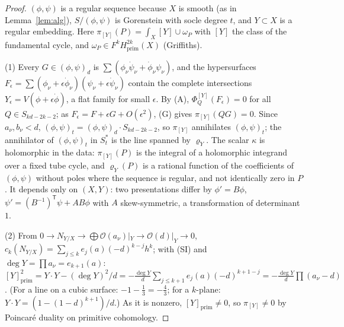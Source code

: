 \documentclass[11pt]{article}
\numberwithin{equation}{section}
\theoremstyle{remark}
\newcommand{\T}{\mathsf{T}}
\begin{document}
\begin{proof}
$(\phi,\psi)$ is a regular sequence because $X$ is smooth (as in Lemma~\ref{lem:alg}), $S/(\phi,\psi)$ is Gorenstein
with socle degree $t$, and $Y\subset X$ is a regular embedding. Here $\pi_{[Y]}(P)=\int_X[Y]\cup\omega_P$ with $[Y]$
the class of the fundamental cycle, and $\omega_P\in F^kH^{2k}_{\mathrm{prim}}(X)$ (Griffiths).

(1) Every $G\in(\phi,\psi)_d$ is $\sum(\phi_\nu\dot\psi_\nu+\dot\phi_\nu\psi_\nu)$, and the hypersurfaces
$F_\epsilon=\sum(\phi_\nu+\epsilon\dot\phi_\nu)(\psi_\nu+\epsilon\dot\psi_\nu)$ contain the complete intersections
$Y_\epsilon=V(\phi+\epsilon\dot\phi)$, a flat family for small $\epsilon$. By (A), $\Phi^{[Y]}_Q(F_\epsilon)=0$ for
all $Q\in S_{kd-2k-2}$; as $F_\epsilon=F+\epsilon G+O(\epsilon^2)$, (G) gives $\pi_{[Y]}(QG)=0$. Since
$a_\nu,b_\nu<d$, $(\phi,\psi)_t=(\phi,\psi)_d\cdot S_{kd-2k-2}$, so $\pi_{[Y]}$ annihilates $(\phi,\psi)_t$; the
annihilator of $(\phi,\psi)_t$ in $S_t^*$ is the line spanned by $\varrho_Y$. The scalar $\kappa$ is holomorphic
in the data: $\pi_{[Y]}(P)$ is the integral of a holomorphic integrand over a fixed tube cycle, and $\varrho_Y(P)$
is a rational function of the coefficients of $(\phi,\psi)$ without poles where the sequence is regular, and not
identically zero in $P$. It depends only on $(X,Y)$: two presentations differ by
$\phi'=B\phi$, $\psi'=(B^{-1})^\T\psi+AB\phi$ with $A$ skew-symmetric, a transformation of determinant $1$.

(2) From $0\to N_{Y/X}\to\bigoplus\mathcal O(a_\nu)|_Y\to\mathcal O(d)|_Y\to0$,
$c_k(N_{Y/X})=\sum_{j\le k}e_j(a)(-d)^{k-j}h^k$; with (SI) and $\deg Y=\prod a_\nu=e_{k+1}(a)$:
$[Y]_{\mathrm{prim}}^2=Y\cdot Y-(\deg Y)^2/d=-\frac{\deg Y}d\sum_{j\le k+1}e_j(a)(-d)^{k+1-j}=-\frac{\deg Y}d\prod(a_\nu-d)$.
(For a line on a cubic surface: $-1-\frac13=-\frac43$; for a $k$-plane: $Y\cdot Y=(1-(1-d)^{k+1})/d$.) As it is
nonzero, $[Y]_{\mathrm{prim}}\ne0$, so $\pi_{[Y]}\ne0$ by Poincar\'e duality on primitive cohomology.


\end{proof}
\end{document}
